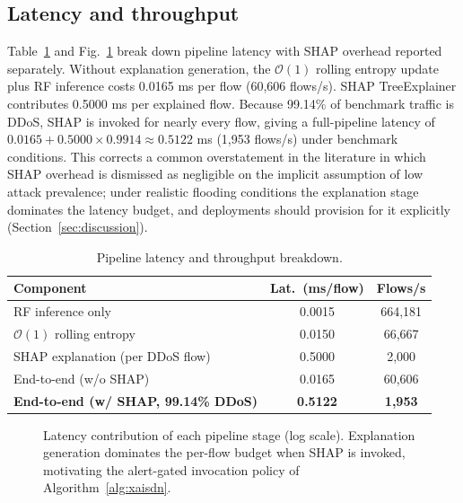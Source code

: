 ﻿\documentclass[journal]{IEEEtran}
\begin{document}
\subsection{Latency and throughput}
Table~\ref{tab:latency} and Fig.~\ref{fig:latency} break down pipeline latency with SHAP overhead reported separately. Without explanation generation, the $\mathcal{O}(1)$ rolling entropy update plus RF inference costs 0.0165 ms per flow (60,606 flows/s). SHAP TreeExplainer contributes 0.5000 ms per explained flow. Because 99.14\% of benchmark traffic is DDoS, SHAP is invoked for nearly every flow, giving a full-pipeline latency of $0.0165 + 0.5000 \times 0.9914 \approx 0.5122$ ms (1,953 flows/s) under benchmark conditions. This corrects a common overstatement in the literature in which SHAP overhead is dismissed as negligible on the implicit assumption of low attack prevalence; under realistic flooding conditions the explanation stage dominates the latency budget, and deployments should provision for it explicitly (Section~\ref{sec:discussion}).

\begin{table}[!t]
\centering
\caption{Pipeline latency and throughput breakdown.}
\label{tab:latency}
\small
\setlength{\tabcolsep}{4pt}
\begin{tabular}{@{}lcc@{}}
\toprule
\textbf{Component} & \textbf{Lat.\ (ms/flow)} & \textbf{Flows/s} \\
\midrule
RF inference only & 0.0015 & 664,181 \\
$\mathcal{O}(1)$ rolling entropy & 0.0150 & 66,667 \\
SHAP explanation (per DDoS flow) & 0.5000 & 2,000 \\
End-to-end (w/o SHAP) & 0.0165 & 60,606 \\
\textbf{End-to-end (w/ SHAP, 99.14\% DDoS)} & \textbf{0.5122} & \textbf{1,953} \\
\bottomrule
\end{tabular}
\end{table}

\begin{figure}[!t]
\centering
{}
\caption{Latency contribution of each pipeline stage (log scale). Explanation generation dominates the per-flow budget when SHAP is invoked, motivating the alert-gated invocation policy of Algorithm~\ref{alg:xaisdn}.}
\label{fig:latency}
\end{figure}
\end{document}
